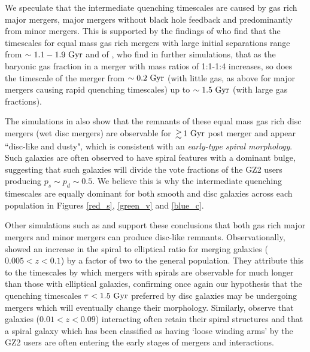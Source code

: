 \documentclass[useAMS,usenatbib]{mn2e}
\def\changed    {\color{titlecol} }
\begin{document}
We speculate that the intermediate quenching timescales are caused by gas rich major mergers, major mergers without black hole feedback and predominantly from minor mergers. This is supported by the findings of \citet{Lotz08}  who find that the timescales for equal mass gas rich mergers with large initial separations range from $\sim 1.1-1.9~\rm{Gyr}$ and of \citet{Lotz11}, who find in further simulations, that as the baryonic gas fraction in a merger with mass ratios of 1:1-1:4 increases, so does the timescale of the merger from $\sim0.2~\rm{Gyr}$ (with little gas, as above for major mergers causing rapid quenching timescales) up to $\sim1.5~\rm{Gyr}$ (with large gas fractions). 

The simulations in \citet{Lotz08} also show that the remnants of these equal mass gas rich disc mergers (wet disc mergers) are observable for $\ga1~\rm{Gyr}$ post merger and appear ``disc-like and dusty", which is consistent with an \emph{early-type spiral morphology}.  Such galaxies are often observed to have spiral features with a dominant bulge, suggesting that such galaxies will divide the vote fractions of the GZ2 users producing $p_s \sim p_d \sim 0.5$. We believe this is why the intermediate quenching timescales are equally dominant for both smooth and disc galaxies across each population in Figures \ref{red_s}, \ref{green_v} and \ref{blue_c}. 

Other simulations such as \citet{Rob06} and \citet{Barnes02} support these conclusions that both gas rich major mergers and minor mergers can produce disc-like remnants. Observationally, \citet{Darg10a} showed an increase in the spiral to elliptical ratio for merging galaxies ($0.005 < z < 0.1$) by a factor of two to the general population. They attribute this to the timescales by which mergers with spirals are observable for much longer than those with elliptical galaxies, {\changed confirming once again our hypothesis that the quenching timescales $\tau < 1.5 ~\rm{Gyr}$ preferred by disc galaxies may be undergoing mergers which will eventually change their morphology}. Similarly, \citet{Casteels13} observe that galaxies ($0.01 < z < 0.09$) interacting often retain their spiral structures and that a spiral galaxy which has been classified as having `loose winding arms' by the GZ2 users are often entering the early stages of mergers and interactions.
\end{document}

